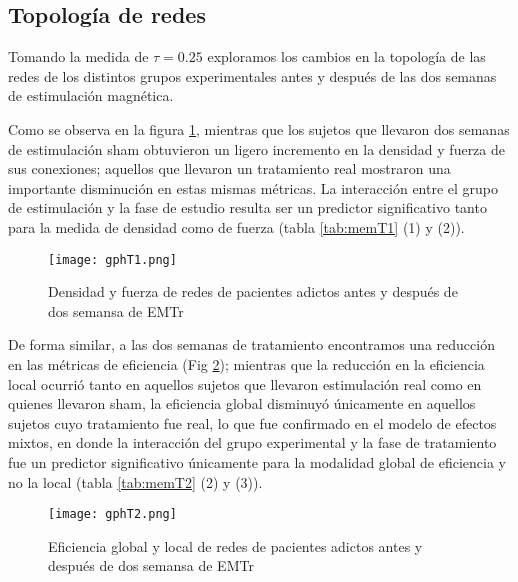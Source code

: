 \subsection{Topología de redes}
Tomando la medida de $\tau = 0.25$ exploramos los cambios en la topología de las redes de los distintos grupos experimentales antes y después de las dos semanas de estimulación magnética.\par
Como se observa en la figura \ref{fig:gpT1}, mientras que los sujetos que llevaron dos semanas de estimulación sham obtuvieron un ligero incremento en la densidad y fuerza de sus conexiones; aquellos que llevaron un tratamiento real mostraron una importante disminución en estas mismas métricas. La interacción entre el grupo de estimulación y la fase de estudio resulta ser un predictor significativo tanto para la medida de densidad como de fuerza (tabla \ref{tab:memT1} (1) y (2)).\par

\begin{figure}[!ht]
    \centering
    \texttt{[image: gphT1.png]}
    \caption{Densidad y fuerza de redes de pacientes adictos antes y después de dos semansa de EMTr}
    \label{fig:gpT1}
\end{figure}

De forma similar, a las dos semanas de tratamiento encontramos una reducción en las métricas de eficiencia (Fig \ref{fig:gpT2}); mientras que la reducción en la eficiencia local ocurrió tanto en aquellos sujetos que llevaron estimulación real como en quienes llevaron sham, la eficiencia global disminuyó únicamente en aquellos sujetos cuyo tratamiento fue real, lo que fue confirmado en el modelo de efectos mixtos, en donde la interacción del grupo experimental y la fase de tratamiento fue un predictor significativo únicamente para la modalidad global de eficiencia y no la local (tabla \ref{tab:memT2} (2) y (3)).\par

\begin{figure}[!ht]
    \centering
    \texttt{[image: gphT2.png]}
    \caption{Eficiencia global y local de redes de pacientes adictos antes y después de dos semansa de EMTr}
    \label{fig:gpT2}
\end{figure}

